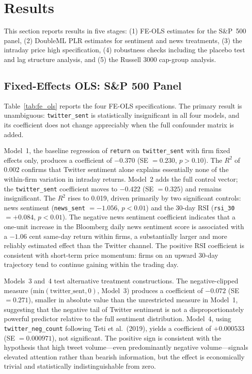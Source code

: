 \section{Results}\label{results}

This section reports results in five stages: (1) FE-OLS estimates for
the S\&P~500 panel, (2) DoubleML PLR estimates for sentiment and news
treatments, (3) the intraday price high specification, (4) robustness
checks including the placebo test and lag structure analysis, and (5)
the Russell 3000 cap-group analysis.

\subsection{Fixed-Effects OLS: S\&P 500
Panel}\label{fixed-effects-ols-sp-500-panel}

Table~\ref{tab:fe_ols} reports the four
FE-OLS specifications. The primary result is unambiguous:
\texttt{twitter\_sent} is statistically insignificant in all four
models, and its coefficient does not change appreciably when the full
confounder matrix is added.

Model~1, the baseline regression of \texttt{return} on
\texttt{twitter\_sent} with firm fixed effects only, produces a
coefficient of \(- 0.370\) (SE \(= 0.230\), \(p > 0.10\)). The \(R^{2}\)
of 0.002 confirms that Twitter sentiment alone explains essentially none
of the within-firm variation in intraday returns. Model~2 adds the full
control vector; the \texttt{twitter\_sent} coefficient moves to
\(- 0.422\) (SE \(= 0.325\)) and remains insignificant. The \(R^{2}\)
rises to 0.019, driven primarily by two significant controls: news
sentiment (\texttt{news\_sent} \(= - 1.056\), \(p < 0.01\)) and the
30-day RSI (\texttt{rsi\_30} \(= + 0.084\), \(p < 0.01\)). The negative
news sentiment coefficient indicates that a one-unit increase in the
Bloomberg daily news sentiment score is associated with a \(- 1.06\)
cent same-day return within firms, a substantially larger and more
reliably estimated effect than the Twitter channel. The positive RSI
coefficient is consistent with short-term price momentum: firms on an
upward 30-day trajectory tend to continue gaining within the trading
day.

Models~3 and~4 test alternative treatment constructions. The
negative-clipped measure (\(\text{min}(\text{twitter\_sent},0)\),
Model~3) produces a coefficient of \(- 0.072\) (SE \(= 0.271\)), smaller
in absolute value than the unrestricted measure in Model~1, suggesting
that the negative tail of Twitter sentiment is not a disproportionately
powerful predictor relative to the full sentiment distribution. Model~4,
using \texttt{twitter\_neg\_count} following Teti et al.\ (2019), yields a coefficient of
\(+ 0.000533\) (SE \(= 0.000971\)), not significant. The positive sign
is consistent with the hypothesis that high tweet volume---even
predominantly negative volume---signals elevated attention rather than
bearish information, but the effect is economically trivial and
statistically indistinguishable from zero.

